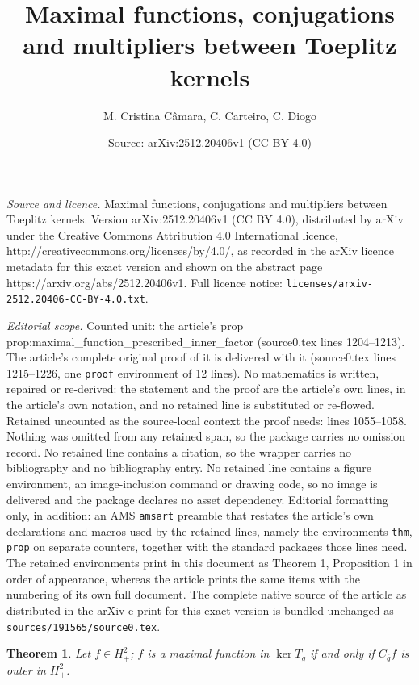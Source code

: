 \documentclass[10pt,a4paper]{amsart}
\title{Maximal functions, conjugations and multipliers between Toeplitz kernels}
\author{M. Cristina C\^amara, C. Carteiro, C. Diogo}
\date{Source: arXiv:2512.20406v1 (CC BY 4.0)}
\newtheorem{thm}{Theorem}
\newcommand{\Cg}{\ensuremath{C_{\ol g}}}
\newcommand{\Hp}{\ensuremath{H^2_+}}
\newcommand{\ol}[1]{\ensuremath{\overline{#1}}}
\begin{document}
\maketitle

\noindent\emph{Source and licence.} Maximal functions, conjugations and multipliers between Toeplitz kernels. Version arXiv:2512.20406v1 (CC BY 4.0), distributed by arXiv under the Creative Commons Attribution 4.0 International licence, http://creativecommons.org/licenses/by/4.0/, as recorded in the arXiv licence metadata for this exact version and shown on the abstract page https://arxiv.org/abs/2512.20406v1. Full licence notice: \texttt{licenses/arxiv-2512.20406-CC-BY-4.0.txt}.\par\smallskip

\noindent\textit{Editorial scope.} Counted unit: the article's prop prop:maximal\_function\_prescribed\_inner\_factor (source0.tex lines 1204--1213). The article's complete original proof of it is delivered with it (source0.tex lines 1215--1226, one \texttt{proof} environment of 12 lines). No mathematics is written, repaired or re-derived: the statement and the proof are the article's own lines, in the article's own notation, and no retained line is substituted or re-flowed.  Retained uncounted as the source-local context the proof needs: lines 1055--1058.  Nothing was omitted from any retained span, so the package carries no omission record.  No retained line contains a citation, so the wrapper carries no bibliography and no bibliography entry.  No retained line contains a figure environment, an image-inclusion command or drawing code, so no image is delivered and the package declares no asset dependency.  Editorial formatting only, in addition: an AMS \texttt{amsart} preamble that restates the article's own declarations and macros used by the retained lines, namely the environments \texttt{thm}, \texttt{prop} on separate counters, together with the standard packages those lines need.  The retained environments print in this document as Theorem 1, Proposition 1 in order of appearance, whereas the article prints the same items with the numbering of its own full document.  The complete native source of the article as distributed in the arXiv e-print for this exact version is bundled unchanged as \texttt{sources/191565/source0.tex}.
\begin{thm}
\label{thm:max_func_charact_with_conj}
Let $f\in\Hp$; $f$ is a maximal function in $\ker T_g$ if and only if $\Cg f$ is outer in \Hp.
\end{thm}
\end{document}
